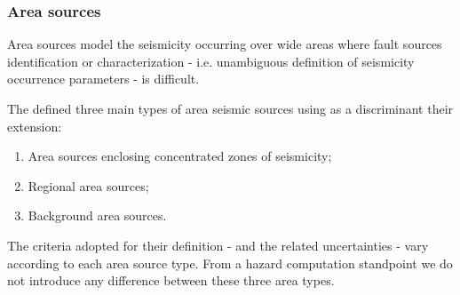 \subsubsection{Area sources}
\label{hazard:seismic_source_types:areaSources}
Area sources model the seismicity occurring over wide areas where fault 
sources identification or characterization - i.e. unambiguous definition 
of seismicity occurrence parameters - is difficult. 

The \citet{sshac1997} defined three main types of area seismic sources using as 
a discriminant their extension:
\begin{enumerate}
\item Area sources enclosing concentrated zones of seismicity;
\item Regional area sources;
\item Background area sources.
\end{enumerate}
The criteria adopted for their definition - and the related uncertainties - vary according to each area source type. From a hazard computation standpoint we do not introduce any difference between these three area types.
%
